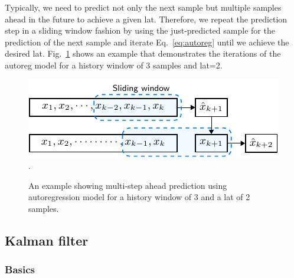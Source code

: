 \documentclass[sigconf]{acmart}			%
\begin{document}
Typically, we need to predict not only the next sample but multiple samples ahead in the future to achieve a given \acrfull{lat}. 
Therefore, we repeat the prediction step in a sliding window fashion by using the just-predicted sample for the prediction of the next sample and iterate Eq.~\eqref{eq:autoreg} until we achieve the desired \gls{lat}.
Fig.~\ref{fig:autoreg} shows an example that demonstrates the iterations of the \gls{autoreg} model for a history window of 3 samples and \gls{lat}=2.

\begin{figure}[ht]
	\includegraphics[width=\linewidth]{autoreg2.pdf}.
	\caption{An example showing multi-step ahead prediction using autoregression model for a history window of 3 and a \acrfull{lat} of 2 samples.}
	\label{fig:autoreg}
\end{figure}

\subsection{Kalman filter}
\subsubsection*{Basics}
\label{sec:kalman}
\end{document}
